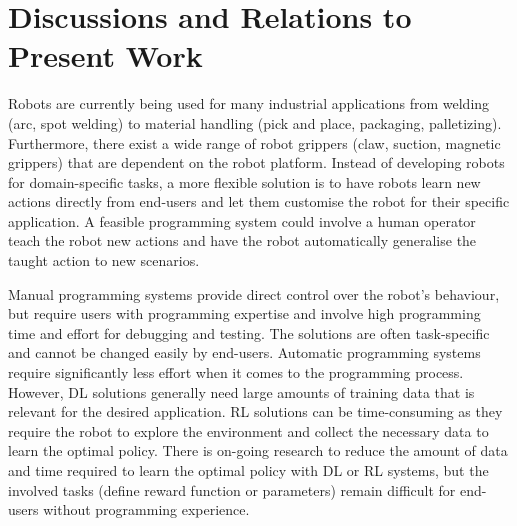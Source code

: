 \section{Discussions and Relations to Present Work}\label{sota-discussions}
Robots are currently being used for many industrial applications from welding (\eg arc, spot welding) to material handling (\eg pick and place, packaging, palletizing).
Furthermore, there exist a wide range of robot grippers (\eg claw, suction, magnetic grippers) that are dependent on the robot platform.
Instead of developing robots for domain-specific tasks, a more flexible solution is to have robots learn new actions directly from end-users and let them customise the robot for their specific application.
A feasible programming system could involve a human operator teach the robot new actions and have the robot automatically generalise the taught action to new scenarios.

Manual programming systems provide direct control over the robot's behaviour, but require users with programming expertise and involve high programming time and effort for debugging and testing.
The solutions are often task-specific and cannot be changed easily by end-users.
Automatic programming systems require significantly less effort when it comes to the programming process. 
However, DL solutions generally need large amounts of training data that is relevant for the desired application.
RL solutions can be time-consuming as they require the robot to explore the environment and collect the necessary data to learn the optimal policy.
There is on-going research to reduce the amount of data and time required to learn the optimal policy with DL or RL systems, but the involved tasks (\eg define reward function or parameters) remain difficult for end-users without programming experience. %

